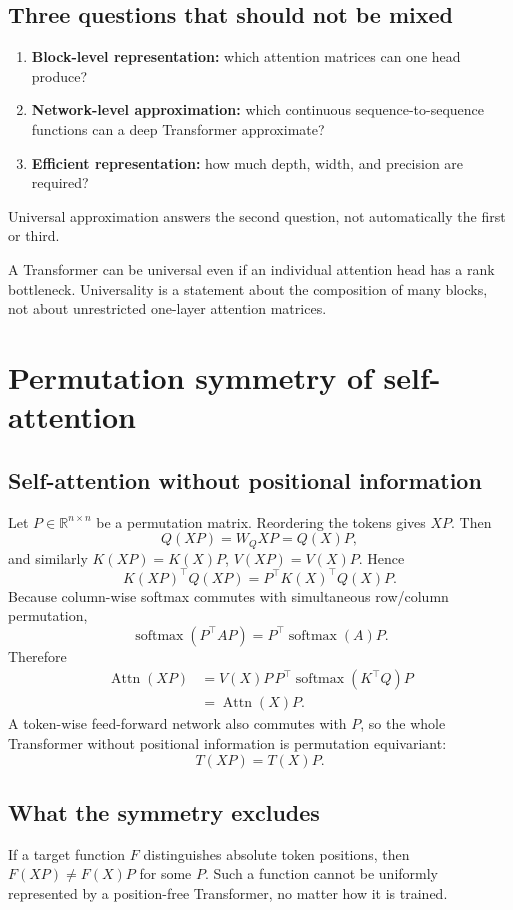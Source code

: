 \documentclass[11pt,a4paper,oneside,openany]{memoir}
\newcommand{\R}{\mathbb{R}}
\theoremstyle{definition}
\begin{document}
\section{Three questions that should not be mixed}
\begin{enumerate}
\item \textbf{Block-level representation:} which attention matrices can one head produce?
\item \textbf{Network-level approximation:} which continuous sequence-to-sequence functions can a deep Transformer approximate?
\item \textbf{Efficient representation:} how much depth, width, and precision are required?
\end{enumerate}
Universal approximation answers the second question, not automatically the first or third.

\begin{presentbox}
A Transformer can be universal even if an individual attention head has a rank bottleneck.  Universality is a statement about the composition of many blocks, not about unrestricted one-layer attention matrices.
\end{presentbox}

\chapter{Permutation symmetry of self-attention}
\section{Self-attention without positional information}
Let $P\in\R^{n\times n}$ be a permutation matrix.  Reordering the tokens gives $XP$.  Then
\[
Q(XP)=W_QXP=Q(X)P,
\]
and similarly $K(XP)=K(X)P$, $V(XP)=V(X)P$.  Hence
\[
K(XP)^\top Q(XP)=P^\top K(X)^\top Q(X)P.
\]
Because column-wise softmax commutes with simultaneous row/column permutation,
\[
\operatorname{softmax}(P^\top AP)=P^\top\operatorname{softmax}(A)P.
\]
Therefore
\begin{align*}
\operatorname{Attn}(XP)
&=V(X)P\,P^\top\operatorname{softmax}(K^\top Q)P\\
&=\operatorname{Attn}(X)P.
\end{align*}
A token-wise feed-forward network also commutes with $P$, so the whole Transformer without positional information is permutation equivariant:
\[
\boxed{T(XP)=T(X)P.}
\]

\section{What the symmetry excludes}
If a target function $F$ distinguishes absolute token positions, then $F(XP)\neq F(X)P$ for some $P$.  Such a function cannot be uniformly represented by a position-free Transformer, no matter how it is trained.
\end{document}

